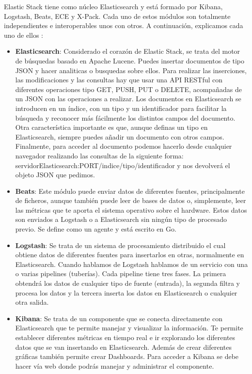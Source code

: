 Elastic Stack tiene como núcleo Elasticsearch y está formado por Kibana, Logstash, Beats, ECE y X-Pack. Cada uno de estos módulos son totalmente independientes e interoperables unos con otros. A continuación, explicamos cada uno de ellos \cite{Elk-4}:
\begin{itemize}
        \item \textbf{Elasticsearch}: Considerado el corazón de Elastic Stack, se trata del motor de búsquedas basado en Apache Lucene. Puedes insertar documentos de tipo JSON y hacer analiticas o busquedas sobre ellos. Para realizar las inserciones, las modificaciones y las consultas hay que usar una API RESTful con diferentes operaciones tipo GET, PUSH, PUT o DELETE, acompañadas de un JSON con las operaciones a realizar. Los documentos en Elasticsearch se introducen en un índice, con un tipo y un identificador para facilitar la búsqueda y reconocer más fácilmente los distintos campos del documento. Otra característica importante es que, aunque definas un tipo en Elasticsearch, siempre puedes añadir un documento con otros campos. Finalmente, para acceder al documento podemos hacerlo desde cualquier navegador realizando las consultas de la siguiente forma: servidorElasticsearch:PORT/indice/tipo/identificador y nos devolverá el objeto JSON que pedimos.
        \item \textbf{Beats}: Este módulo puede enviar datos de diferentes fuentes, principalmente de ficheros, aunque también puede leer de bases de datos o, simplemente, leer las métricas que te aporta el sistema operativo sobre el hardware. Estos datos son enviados a Logstash o a Elasticsearch sin ningún tipo de procesado previo. Se define como un agente y está escrito en Go.
        \item \textbf{Logstash}: Se trata de un sistema de procesamiento distribuido el cual obtiene datos de diferentes fuentes para insertarlos en otras, normalmente en Elasticsearch. Cuando hablamos de Logstash hablamos de un servicio con una o varias pipelines (tuberías). Cada pipeline tiene tres fases. La primera obtendrá los datos de cualquier tipo de fuente (entrada), la segunda filtra y procesa los datos y la tercera inserta los datos en Elasticsearch o cualquier otra salida.
        \item \textbf{Kibana}: Se trata de un componente que se conecta directamente con Elasticsearch que te permite manejar y visualizar la información. Te permite establecer diferentes métricas en tiempo real e ir explorando los diferentes datos que se van insertando en Elasticsearch. Además de crear diferentes gráficas también permite crear Dashboards. Para acceder a Kibana se debe hacer vía web donde podrás manejar y administrar el componente.

\end{itemize}
